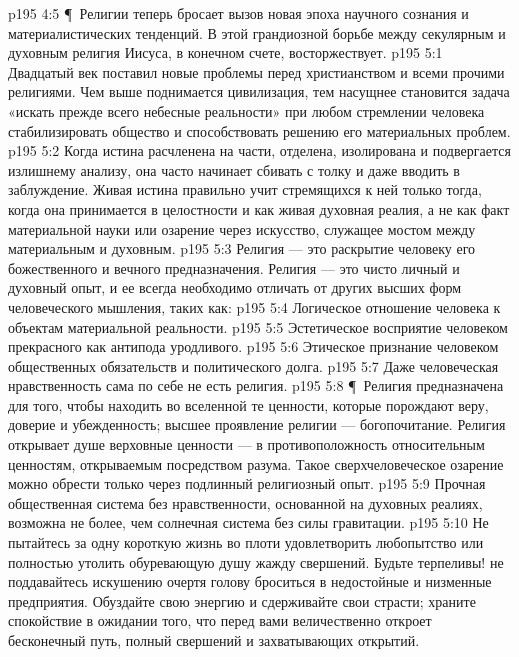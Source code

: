\vs p195 4:5 \P\ Религии теперь бросает вызов новая эпоха научного сознания и материалистических тенденций. В этой грандиозной борьбе между секулярным и духовным религия Иисуса, в конечном счете, восторжествует.
\vs p195 5:1 Двадцатый век поставил новые проблемы перед христианством и всеми прочими религиями. Чем выше поднимается цивилизация, тем насущнее становится задача «искать прежде всего небесные реальности» при любом стремлении человека стабилизировать общество и способствовать решению его материальных проблем.
\vs p195 5:2 Когда истина расчленена на части, отделена, изолирована и подвергается излишнему анализу, она часто начинает сбивать с толку и даже вводить в заблуждение. Живая истина правильно учит стремящихся к ней только тогда, когда она принимается в целостности и как живая духовная реалия, а не как факт материальной науки или озарение через искусство, служащее мостом между материальным и духовным.
\vs p195 5:3 Религия --- это раскрытие человеку его божественного и вечного предназначения. Религия --- это чисто личный и духовный опыт, и ее всегда необходимо отличать от других высших форм человеческого мышления, таких как:
\vs p195 5:4 \bibnobreakspace Логическое отношение человека к объектам материальной реальности.
\vs p195 5:5 \bibnobreakspace Эстетическое восприятие человеком прекрасного как антипода уродливого.
\vs p195 5:6 \bibnobreakspace Этическое признание человеком общественных обязательств и политического долга.
\vs p195 5:7 \bibnobreakspace Даже человеческая нравственность сама по себе не есть религия.
\vs p195 5:8 \P\ Религия предназначена для того, чтобы находить во вселенной те ценности, которые порождают веру, доверие и убежденность; высшее проявление религии --- богопочитание. Религия открывает душе верховные ценности --- в противоположность относительным ценностям, открываемым посредством разума. Такое сверхчеловеческое озарение можно обрести только через подлинный религиозный опыт.
\vs p195 5:9 Прочная общественная система без нравственности, основанной на духовных реалиях, возможна не более, чем солнечная система без силы гравитации.
\vs p195 5:10 Не пытайтесь за одну короткую жизнь во плоти удовлетворить любопытство или полностью утолить обуревающую душу жажду свершений. Будьте терпеливы! не поддавайтесь искушению очертя голову броситься в недостойные и низменные предприятия. Обуздайте свою энергию и сдерживайте свои страсти; храните спокойствие в ожидании того, что перед вами величественно откроет бесконечный путь, полный свершений и захватывающих открытий.
